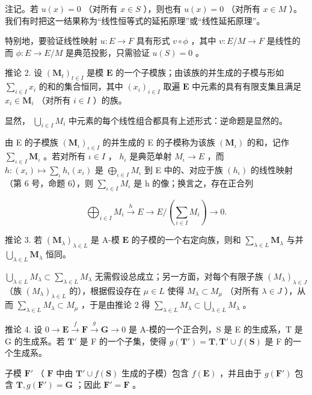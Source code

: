 注记。若 \(u(x) = 0\) （对所有 \(x \in S\) ），则也有 \(u(x) = 0\) （对所有 \(x \in M\) ）。我们有时把这一结果称为“线性恒等式的延拓原理”或“线性延拓原理”。

特别地，要验证线性映射 \(u:E\to F\) 具有形式 \(v\circ\phi\) ，其中 \(v:E/M\to F\) 是线性的而 \(\phi:E\to E/M\) 是典范投影，只需验证 \(u(S)=0\) 。

推论 2. 设 \((\mathbf{M}_{t})_{t\in I}\) 是模 \(\mathbf{E}\) 的一个子模族；由该族的并生成的子模与形如 \(\sum_{i\in I}x_i\) 的和的集合恒同，其中 \((x_{i})_{i\in I}\) 取遍 \(\mathbf{E}\) 中元素的具有有限支集且满足 \(x_{i}\in \mathbf{M}_{i}\) （对所有 \(i\in I\) ）的族。

显然， \(\bigcup_{i\in I}M_i\) 中元素的每个线性组合都具有上述形式：逆命题是显然的。

由 E 的子模族 \((\mathbf{M}_{\iota})_{\iota\in I}\) 的并生成的 E 的子模称为该族 \((\mathbf{M}_{\iota})\) 的和，记作 \(\sum_{\iota\in I}\mathbf{M}_{\iota}\) 。若对所有 \(\iota\in I\) ， \(h_{\iota}\) 是典范单射 \(M_{\iota}\to E\) ，而 \(h:(x_{\iota})\mapsto\sum_{\iota}h_{\iota}(x_{\iota})\) 是 \(\bigoplus_{\iota\in I}M_{\iota}\) 到 E 中的、对应于族 \((h_{\iota})\) 的线性映射（第 6 号，命题 6），则 \(\sum_{\iota\in I}M_{\iota}\) 是 h 的像；换言之，存在正合列

\[
\bigoplus_ {i \in I} M _ {i} \xrightarrow {h} E \longrightarrow E / \left(\sum_ {i \in I} M _ {i}\right) \longrightarrow 0.\tag{28}
\]

推论 3. 若 \((\mathbf{M}_{\lambda})_{\lambda \in L}\) 是 A-模 \(\mathbf{E}\) 的子模的一个右定向族，则和 \(\sum_{\lambda \in L} \mathbf{M}_{\lambda}\) 与并 \(\bigcup_{\lambda \in L} \mathbf{M}_{\lambda}\) 恒同。

\(\bigcup_{\lambda \in L} M_{\lambda} \subset \sum_{\lambda \in L} M_{\lambda}\) 无需假设总成立；另一方面，对每个有限子族 \((M_{\lambda})_{\lambda \in J}\) （族 \((M_{\lambda})_{\lambda \in L}\) 的），根据假设存在 \(\mu \in L\) 使得 \(M_{\lambda} \subset M_{\mu}\) （对所有 \(\lambda \in J\) ），从而 \(\sum_{\lambda \in L} M_{\lambda} \subset M_{\mu}\) ，于是由推论 2 得 \(\sum_{\lambda \in L} M_{\lambda} \subset \bigcup_{\lambda \in L} M_{\lambda}\) 。

推论 4. 设 \(0 \to \mathbf{E} \xrightarrow{f} \mathbf{F} \xrightarrow{g} \mathbf{G} \to 0\) 是 A-模的一个正合列，S 是 E 的生成系，T 是 G 的生成系。若 \(\mathbf{T}'\) 是 F 的一个子集，使得 \(g(\mathbf{T}') = \mathbf{T}, \mathbf{T}' \cup f(\mathbf{S})\) 是 F 的一个生成系。

子模 \(\mathbf{F}'\) （ \(\mathbf{F}\) 中由 \(\mathbf{T}' \cup f(\mathbf{S})\) 生成的子模）包含 \(f(\mathbf{E})\) ，并且由于 \(g(\mathbf{F}')\) 包含 \(\mathbf{T}, g(\mathbf{F}') = \mathbf{G}\) ；因此 \(\mathbf{F}' = \mathbf{F}\) 。

